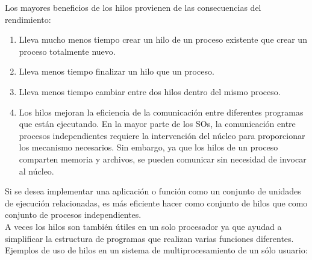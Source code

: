 \documentclass{article}
\begin{document}
					Los mayores beneficios de los hilos provienen de las consecuencias del rendimiento: 
					
					\begin{enumerate}
					\item Lleva mucho menos tiempo crear un hilo de un proceso existente que crear un proceso totalmente nuevo.
					\item Lleva menos tiempo finalizar un hilo que un proceso.
					\item Lleva menos tiempo cambiar entre dos hilos dentro del mismo proceso.
					\item Los hilos mejoran la eficiencia de la comunicación entre diferentes programas que están ejecutando. En la mayor parte de los SOs, la comunicación entre procesos independientes requiere la intervención del núcleo para proporcionar los mecanismo necesarios. Sin embargo, ya que los hilos de un proceso comparten memoria y archivos, se pueden comunicar sin necesidad de invocar al núcleo.
					\end{enumerate}
					
					Si se desea implementar una aplicación o función como un conjunto de unidades de ejecución relacionadas, es más eficiente hacer como conjunto de hilos que como conjunto de procesos independientes. \\
					
					A veces los hilos son también útiles en un solo procesador ya que ayudad a simplificar la estructura de programas que realizan varias funciones diferentes. \\
					
					Ejemplos de uso de hilos en un sistema de multiprocesamiento de un sólo usuario:
					
\end{document}
